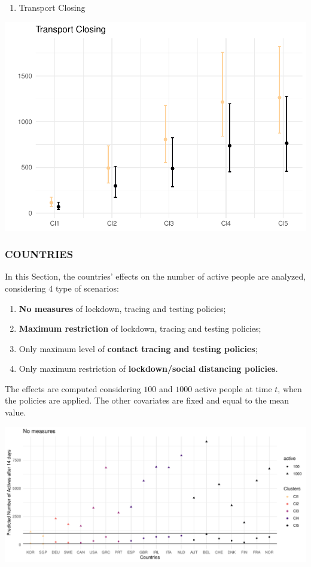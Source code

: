 \documentclass[
  6pt,
]{article}
\providecommand{\tightlist}{%
  \setlength{\itemsep}{0pt}\setlength{\parskip}{0pt}}
\begin{document}
\begin{enumerate}
\def\labelenumi{\arabic{enumi}.}
\setcounter{enumi}{5}
\tightlist
\item
  Transport Closing
\end{enumerate}
\begin{center}
\includegraphics[width=0.7\linewidth]{Report_SC_Group3_files/figure-latex/unnamed-chunk-28-1}
\end{center}
\hypertarget{countries}{%
\subsubsection{COUNTRIES}\label{countries}}

In this Section, the countries' effects on the number of active people
are analyzed, considering \(4\) type of scenarios:

\begin{enumerate}
\def\labelenumi{\arabic{enumi}.}
\item
  \textbf{No measures} of lockdown, tracing and testing policies;
\item
  \textbf{Maximum restriction} of lockdown, tracing and testing
  policies;
\item
  Only maximum level of \textbf{contact tracing and testing policies};
\item
  Only maximum restriction of \textbf{lockdown/social distancing
  policies}.
\end{enumerate}

The effects are computed considering \(100\) and \(1000\) active people
at time \(t\), when the policies are applied. The other covariates are
fixed and equal to the mean value.

\begin{center}\includegraphics{Report_SC_Group3_files/figure-latex/unnamed-chunk-29-1} \end{center}
\end{document}
